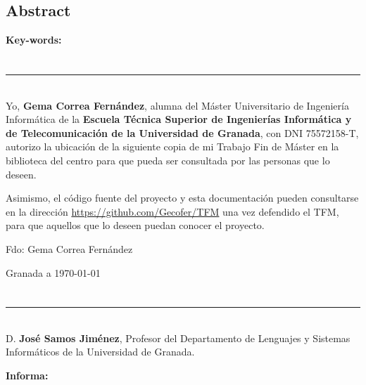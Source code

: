 \section*{Abstract} 



\vspace{0.25in}

{\bf Key-words:} 

\chapter*{}
\thispagestyle{empty}

\noindent\rule[-1ex]{\textwidth}{2pt}\\[4.5ex]

Yo, \textbf{Gema Correa Fernández}, alumna del Máster Universitario de Ingeniería Informática de la \textbf{Escuela Técnica Superior de Ingenierías Informática y de Telecomunicación de la Universidad de Granada}, con DNI 75572158-T, autorizo la ubicación de la siguiente copia de mi Trabajo Fin de Máster en la biblioteca del centro para que pueda ser consultada por las personas que lo deseen.\newline

Asimismo, el código fuente del proyecto y esta documentación pueden consultarse en la dirección \url{https://github.com/Gecofer/TFM} una vez defendido el TFM, para que aquellos que lo deseen puedan conocer el proyecto.

\vspace{5cm}

\noindent Fdo: Gema Correa Fernández

\vspace{2cm}

\begin{flushright}
Granada a \today
\end{flushright}


\chapter*{}
\thispagestyle{empty}

\noindent\rule[-1ex]{\textwidth}{2pt}\\[4.5ex]

D. \textbf{José Samos Jiménez}, Profesor del Departamento de Lenguajes y Sistemas Informáticos de la Universidad de Granada.

\vspace{0.5cm}

\textbf{Informa:}

